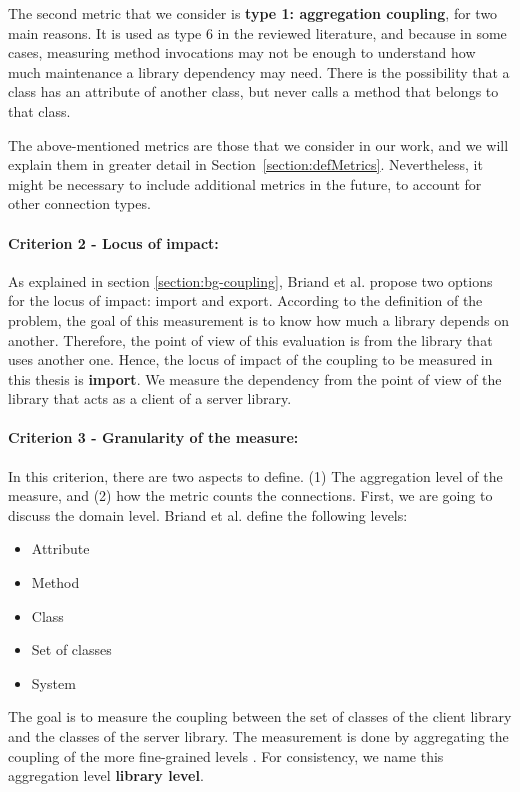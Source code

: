 The second metric that we consider is \textbf{type 1: aggregation coupling}, for two main reasons. It is used as type 6 in the reviewed literature, and because in some cases, measuring method invocations may not be enough to understand how much maintenance a library dependency may need. There is the possibility that a class has an attribute of another class, but never calls a method that belongs to that class.

The above-mentioned metrics are those that we consider in our work, and we will explain them in greater detail in Section~\ref{section:defMetrics}. Nevertheless, it might be necessary to include additional metrics in the future, to account for other connection types.

\paragraph{Criterion 2 - Locus of impact:}
As explained in section \ref{section:bg-coupling}, Briand et al. \cite{briand1999unified} propose two options for the locus of impact: import and export. According to the definition of the problem, the goal of this measurement is to know how much a library depends on another. Therefore, the point of view of this evaluation is from the library that uses another one. Hence, the locus of impact of the coupling to be measured in this thesis is \textbf{import}. We measure the dependency from the point of view of the library that acts as a client of a server library.

\paragraph{Criterion 3 - Granularity of the measure:}
In this criterion, there are two aspects to define. (1) The aggregation level of the measure, and (2) how the metric counts the connections. First, we are going to discuss the domain level. Briand et al. \cite{briand1999unified} define the following levels:

\begin{itemize}[noitemsep]
  \renewcommand\labelitemi{--}
  \item Attribute
  \item Method
  \item Class
  \item Set of classes
  \item System
\end{itemize}

\blankls
The goal is to measure the coupling between the set of classes of the client library and the classes of the server library. The measurement is done by aggregating the coupling of the more fine-grained levels \cite{briand1999unified}. For consistency, we name this aggregation level \textbf{library level}.

